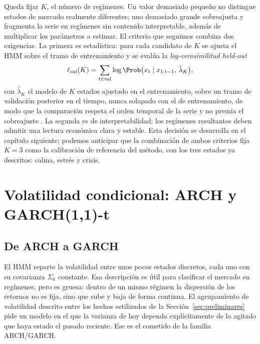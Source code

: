 Queda fijar $K$, el número de regímenes. Un valor demasiado pequeño no distingue estados de mercado realmente diferentes; uno demasiado grande sobreajusta y fragmenta la serie en regímenes sin contenido interpretable, además de multiplicar los parámetros a estimar. El criterio que seguimos combina dos exigencias. La primera es estadística: para cada candidato de $K$ se ajusta el HMM sobre el tramo de entrenamiento y se evalúa la \emph{log-verosimilitud held-out}
\[
\ell_{\mathrm{val}}(K) = \sum_{t \in \mathrm{val}} \log \Prob\big(x_t \mid x_{1:t-1},\, \hat{\lambda}_K\big),
\]
con $\hat{\lambda}_K$ el modelo de $K$ estados ajustado en el entrenamiento, sobre un tramo de validación posterior en el tiempo, nunca solapado con el de entrenamiento, de modo que la comparación respeta el orden temporal de la serie y no premia el sobreajuste \cite{rabiner1989}. La segunda es de interpretabilidad: los regímenes resultantes deben admitir una lectura económica clara y estable. Esta decisión se desarrolla en el capítulo siguiente; podemos anticipar que la combinación de ambos criterios fija $K = 3$ como la calibración de referencia del método, con los tres estados ya descritos: calma, estrés y crisis.

\section{Volatilidad condicional: ARCH y GARCH(1,1)-t}
\label{sec:garch}

\subsection{De ARCH a GARCH}
\label{sec:garch-arch}

El HMM reparte la volatilidad entre unos pocos estados discretos, cada uno con su covarianza $\Sigma_k$ constante. Esa descripción es útil para clasificar el mercado en regímenes, pero es gruesa: dentro de un mismo régimen la dispersión de los retornos no es fija, sino que sube y baja de forma continua. El agrupamiento de volatilidad descrito entre los hechos estilizados de la Sección~\ref{sec:preliminares} pide un modelo en el que la varianza de hoy dependa explícitamente de lo agitado que haya estado el pasado reciente. Ese es el cometido de la familia ARCH/GARCH.

